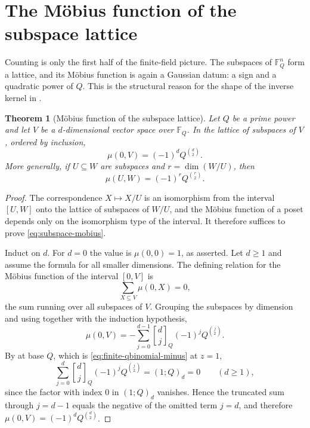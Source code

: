 \documentclass[11pt,oneside,openany]{book}
\newtheorem{theorem}{Theorem}[chapter]
\theoremstyle{definition}
\theoremstyle{remark}
\newcommand{\Qbinom}[3]{\genfrac{[}{]}{0pt}{}{#1}{#2}_{#3}}
\newcommand{\F}{\mathbb F}
\begin{document}

\section{The M\"obius function of the subspace lattice}

Counting is only the first half of the finite-field picture.  The subspaces of $\F_Q^n$ form a lattice, and its M\"obius function is again a Gaussian datum: a sign and a quadratic power of $Q$.  This is the structural reason for the shape of the inverse kernel in .

\begin{theorem}[M\"obius function of the subspace lattice]\label{thm:subspace-mobius}
Let $Q$ be a prime power and let $V$ be a $d$-dimensional vector space over $\F_Q$.  In the lattice of subspaces of $V$, ordered by inclusion,
\begin{equation}\label{eq:subspace-mobius}
 \mu(0,V)=(-1)^dQ^{\binom d2}.
\end{equation}
More generally, if $U\subseteq W$ are subspaces and $r=\dim(W/U)$, then
\[
 \mu(U,W)=(-1)^rQ^{\binom r2}.
\]
\end{theorem}

\begin{proof}
The correspondence $X\mapsto X/U$ is an isomorphism from the interval $[U,W]$ onto the lattice of subspaces of $W/U$, and the M\"obius function of a poset depends only on the isomorphism type of the interval.  It therefore suffices to prove \eqref{eq:subspace-mobius}.

Induct on $d$.  For $d=0$ the value is $\mu(0,0)=1$, as asserted.  Let $d\ge1$ and assume the formula for all smaller dimensions.  The defining relation for the M\"obius function of the interval $[0,V]$ is
\[
 \sum_{X\subseteq V}\mu(0,X)=0,
\]
the sum running over all subspaces of $V$.  Grouping the subspaces by dimension and using  together with the induction hypothesis,
\[
 \mu(0,V)
 =-\sum_{j=0}^{d-1}\Qbinom djQ(-1)^jQ^{\binom j2}.
\]
By  at base $Q$, which is \eqref{eq:finite-qbinomial-minus} at $z=1$,
\[
 \sum_{j=0}^{d}\Qbinom djQ(-1)^jQ^{\binom j2}=(1;Q)_d=0
 \qquad(d\ge1),
\]
since the factor with index $0$ in $(1;Q)_d$ vanishes.  Hence the truncated sum through $j=d-1$ equals the negative of the omitted term $j=d$, and therefore
$\mu(0,V)=(-1)^dQ^{\binom d2}$.
\end{proof}
\end{document}

